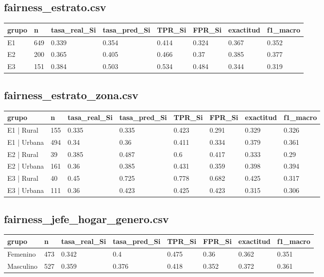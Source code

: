 \subsection*{fairness\_estrato.csv}
{\footnotesize\begin{longtable}{@{}llllllll@{}}
\toprule
grupo & n & tasa\_real\_Si & tasa\_pred\_Si & TPR\_Si & FPR\_Si & exactitud & f1\_macro \\
\midrule\endhead
E1 & 649 & 0.339 & 0.354 & 0.414 & 0.324 & 0.367 & 0.352 \\
E2 & 200 & 0.365 & 0.405 & 0.466 & 0.37 & 0.385 & 0.377 \\
E3 & 151 & 0.384 & 0.503 & 0.534 & 0.484 & 0.344 & 0.319 \\
\bottomrule
\end{longtable}}
\subsection*{fairness\_estrato\_zona.csv}
{\footnotesize\begin{longtable}{@{}llllllll@{}}
\toprule
grupo & n & tasa\_real\_Si & tasa\_pred\_Si & TPR\_Si & FPR\_Si & exactitud & f1\_macro \\
\midrule\endhead
E1 | Rural & 155 & 0.335 & 0.335 & 0.423 & 0.291 & 0.329 & 0.326 \\
E1 | Urbana & 494 & 0.34 & 0.36 & 0.411 & 0.334 & 0.379 & 0.361 \\
E2 | Rural & 39 & 0.385 & 0.487 & 0.6 & 0.417 & 0.333 & 0.29 \\
E2 | Urbana & 161 & 0.36 & 0.385 & 0.431 & 0.359 & 0.398 & 0.394 \\
E3 | Rural & 40 & 0.45 & 0.725 & 0.778 & 0.682 & 0.425 & 0.317 \\
E3 | Urbana & 111 & 0.36 & 0.423 & 0.425 & 0.423 & 0.315 & 0.306 \\
\bottomrule
\end{longtable}}
\subsection*{fairness\_jefe\_hogar\_genero.csv}
{\footnotesize\begin{longtable}{@{}llllllll@{}}
\toprule
grupo & n & tasa\_real\_Si & tasa\_pred\_Si & TPR\_Si & FPR\_Si & exactitud & f1\_macro \\
\midrule\endhead
Femenino & 473 & 0.342 & 0.4 & 0.475 & 0.36 & 0.362 & 0.351 \\
Masculino & 527 & 0.359 & 0.376 & 0.418 & 0.352 & 0.372 & 0.361 \\
\bottomrule
\end{longtable}}
